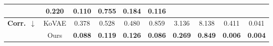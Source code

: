 \documentclass{article}
\theoremstyle{plain}
\theoremstyle{definition}
\theoremstyle{remark}
\begin{document}
{\begin{table*}[!t]
{\begin{tabular}{cc|cccccccc}
          & \cellcolor{blue!10}\textbf{0.220}
          & \cellcolor{blue!10}\textbf{0.110}
          & \cellcolor{blue!10}\textbf{0.755}
          & \cellcolor{blue!10}\textbf{0.184}
          & \cellcolor{blue!10}\textbf{0.116} \\
    \midrule
    \multirow{2}{*}{\textbf{Corr.}~$\downarrow$}
      & KoVAE 
          & 0.378 
          & 0.528 
          & 0.480 
          & 0.859 
          & 3.136 
          & 8.138 
          & 0.411 
          & 0.041 \\
      & Ours  
          & \cellcolor{blue!10}\textbf{0.088}
          & \cellcolor{blue!10}\textbf{0.119}
          & \cellcolor{blue!10}\textbf{0.126}
          & \cellcolor{blue!10}\textbf{0.086}
          & \cellcolor{blue!10}\textbf{0.269}
          & \cellcolor{blue!10}\textbf{0.849}
          & \cellcolor{blue!10}\textbf{0.006}
          & \cellcolor{blue!10}\textbf{0.004} \\
    \midrule
    

\end{tabular}}
\end{table*}}
\end{document}
